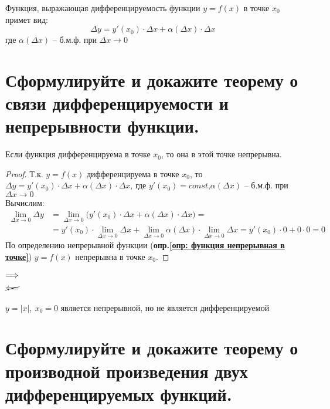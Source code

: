 \begin{corollary}
  Функция, выражающая дифференцируемость функции $y=f(x)$ в точке $x_0$ примет вид:
  \[ \boxed{\Delta y = y'(x_0)\cdot \Delta x + \alpha (\Delta x) \cdot \Delta x} \]
  где $\alpha (\Delta x)$ -- б.м.ф. при $\Delta x \to 0$
\end{corollary}

\newpage
\section{Сформулируйте и докажите теорему о связи дифференцируемости и непрерывности функции.}

\begin{theorem} 
  Если функция дифференцируема в точке $x_0$, то она в этой точке непрерывна.
\end{theorem}
\begin{proof}
  Т.к. $y=f(x)$ дифференцируема в точке $x_0$, то $\Delta y = y'(x_0)\cdot \Delta x + \alpha (\Delta x) \cdot \Delta x$, где $y'(x_0) = const$,\quad $\alpha (\Delta x)$ -- б.м.ф. при $\Delta x \to 0$\\
  Вычислим:
  \begin{align*}
  \lim\limits_{\Delta x \to 0} \Delta y &= \lim\limits_{\Delta x \to 0} \big(y'(x_0)\cdot \Delta x + \alpha (\Delta x) \cdot \Delta x\big) = \\
  &= y'(x_0)\cdot \lim\limits_{\Delta x \to 0} \Delta x + \lim\limits_{\Delta x \to 0} \alpha(\Delta x)\cdot \lim\limits_{\Delta x \to 0} \Delta x = y'(x_0) \cdot 0 + 0\cdot 0 = 0
  \end{align*}
  По определению непрерывной функции (\textbf{опр.\ref{опр: функция непрерывная в точке}}) $y=f(x)$ непрерывна в точке $x_0$.
\end{proof}
\begin{center}
   $\begin{aligned} \Longrightarrow\\ \cancel{\Longleftarrow} \end{aligned}$ 
\end{center}
\begin{eg}
  $y = |x|,\ x_0 = 0$ является непрерывной, но не является дифференцируемой
\end{eg}

\section{Сформулируйте и докажите теорему о производной произведения двух дифференцируемых функций.}

